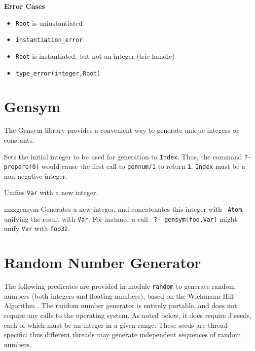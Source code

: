 {\begin{description}
{\bf Error Cases}
\begin{itemize}
\item 	{\tt Root} is uninstantiated
\bi
\item 	 {\tt instantiation\_error}
\ei
\item 	{\tt Root} is instantiated, but not an integer (trie handle)
\bi
\item 	 {\tt type\_error(integer,Root)}
\ei
\end{itemize}


\end{description}
}
\section{Gensym}

The Gensym library provides a convenient way to generate unique
integers or constants.  

\begin{description}
%
Sets the initial integer to be used for generation to {\tt Index}.
Thus, the command {\tt ?- prepare(0)} would cause the first call to
{\tt gennum/1} to return {\tt 1}.  {\tt Index} must be a non-negative
integer.

%
Unifies {\tt Var} with a new integer.

zzzz{gensym} 
%
Generates a new integer, and concatenates this integer with {\tt
Atom}, unifying the result with {\tt Var}.  For instance a call {\tt
?- gensym(foo,Var)} might unify {\tt Var} with {\tt foo32}.
\end{description}

\section{Random Number Generator}

The following predicates are provided in module \texttt{random} to
generate random numbers (both integers and floating numbers), based on
the Wichmann-Hill Algorithm \cite{WicH82,McLe85}.  The random number
generator is entirely portable, and does not require any calls to the
operating system.  As noted below, it does require 3 seeds, each of
which must be an integer in a given range.  These seeds are
thread-specific: thus different threads may generate independent
sequences of random numbers.

